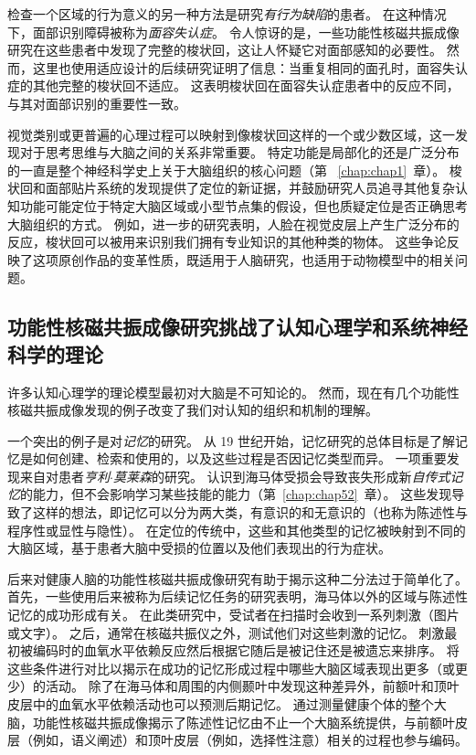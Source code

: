 检查一个区域的行为意义的另一种方法是研究\textit{有行为缺陷}的患者。
在这种情况下，面部识别障碍被称为\textit{面容失认症}。
令人惊讶的是，一些功能性核磁共振成像研究在这些患者中发现了完整的梭状回，这让人怀疑它对面部感知的必要性。 
然而，这里也使用适应设计的后续研究证明了信息：当重复相同的面孔时，面容失认症的其他完整的梭状回不适应。 
这表明梭状回在面容失认症患者中的反应不同，与其对面部识别的重要性一致。


视觉类别或更普遍的心理过程可以映射到像梭状回这样的一个或少数区域，这一发现对于思考思维与大脑之间的关系非常重要。
特定功能是局部化的还是广泛分布的一直是整个神经科学史上关于大脑组织的核心问题（第 ~\ref{chap:chap1}~章）。 
梭状回和面部贴片系统的发现提供了定位的新证据，并鼓励研究人员追寻其他复杂认知功能可能定位于特定大脑区域或小型节点集的假设，但也质疑定位是否正确思考大脑组织的方式。
例如，进一步的研究表明，人脸在视觉皮层上产生广泛分布的反应，梭状回可以被用来识别我们拥有专业知识的其他种类的物体。
这些争论反映了这项原创作品的变革性质，既适用于人脑研究，也适用于动物模型中的相关问题。



\subsection{功能性核磁共振成像研究挑战了认知心理学和系统神经科学的理论}

许多认知心理学的理论模型最初对大脑是不可知论的。 
然而，现在有几个功能性核磁共振成像发现的例子改变了我们对认知的组织和机制的理解。


一个突出的例子是对\textit{记忆}的研究。
从 19 世纪开始，记忆研究的总体目标是了解记忆是如何创建、检索和使用的，以及这些过程是否因记忆类型而异。 
一项重要发现来自对患者\textit{亨利$\cdot$莫莱森}的研究。 
认识到海马体受损会导致丧失形成新\textit{自传式记忆}的能力，但不会影响学习某些技能的能力（第~\ref{chap:chap52}~章）。
这些发现导致了这样的想法，即记忆可以分为两大类，有意识的和无意识的（也称为陈述性与程序性或显性与隐性）。
在定位的传统中，这些和其他类型的记忆被映射到不同的大脑区域，基于患者大脑中受损的位置以及他们表现出的行为症状。


后来对健康人脑的功能性核磁共振成像研究有助于揭示这种二分法过于简单化了。
首先，一些使用后来被称为后续记忆任务的研究表明，海马体以外的区域与陈述性记忆的成功形成有关。
在此类研究中，受试者在扫描时会收到一系列刺激（图片或文字）。
之后，通常在核磁共振仪之外，测试他们对这些刺激的记忆。
刺激最初被编码时的血氧水平依赖反应然后根据它随后是被记住还是被遗忘来排序。
将这些条件进行对比以揭示在成功的记忆形成过程中哪些大脑区域表现出更多（或更少）的活动。
除了在海马体和周围的内侧颞叶中发现这种差异外，前额叶和顶叶皮层中的血氧水平依赖活动也可以预测后期记忆。 
通过测量健康个体的整个大脑，功能性核磁共振成像揭示了陈述性记忆由不止一个大脑系统提供，与前额叶皮层（例如，语义阐述）和顶叶皮层（例如，选择性注意）相关的过程也参与编码。


